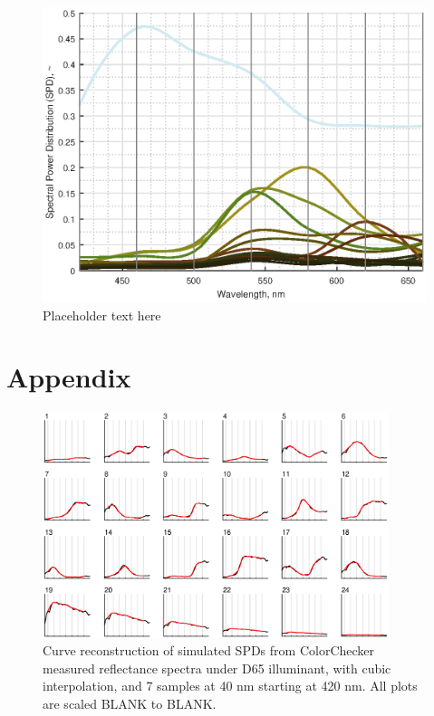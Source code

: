\documentclass[twocolumn,10pt]{asme2ej}
\begin{document}
\begin{figure}[H]
\begin{centering}
  \includegraphics[height=0.6\linewidth]{vermont_path.eps}
  \caption{Placeholder text here}
  \label{path_SPDs}
  \end{centering}
\end{figure}

\clearpage


\section{Appendix}
\label{appendix}

\begin{figure}[H]
\begin{centering}
\includegraphics[width=0.90\textwidth]{colorchecker_reconstruction.eps}
\caption{Curve reconstruction of simulated SPDs from ColorChecker measured reflectance spectra under D65 illuminant, with cubic interpolation, and 7 samples at 40 nm starting at 420 nm. All plots are scaled BLANK to BLANK.}
\label{colorchecker_reconstruction}
\end{centering}
\end{figure}
\end{document}
